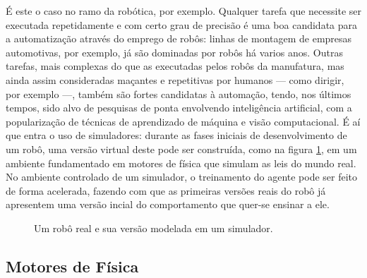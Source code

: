 \documentclass[cic,tc]{iiufrgs}
\begin{document}
É este o caso no ramo da robótica, por exemplo. Qualquer tarefa que necessite
ser executada repetidamente e com certo grau de precisão é uma boa candidata
para a automatização através do emprego de robôs: linhas de montagem de
empresas automotivas, por exemplo, já são dominadas por robôs há varios anos.
Outras tarefas, mais complexas do que as executadas pelos robôs da manufatura,
mas ainda assim consideradas maçantes e repetitivas por humanos --- como
dirigir, por exemplo ---, também são fortes candidatas à automação, tendo, nos
últimos tempos, sido alvo de pesquisas de ponta envolvendo inteligência
artificial, com a popularização de técnicas de aprendizado de máquina e visão
computacional. É aí que entra o uso de simuladores: durante as fases iniciais
de desenvolvimento de um robô, uma versão virtual deste pode ser construída,
como na figura \ref{fig:mujoco_robot}, em um ambiente fundamentado em motores
de física que simulam as leis do mundo real. No ambiente controlado de um
simulador, o treinamento do agente pode ser feito de forma acelerada, fazendo
com que as primeiras versões reais do robô já apresentem uma versão incial do
comportamento que quer-se ensinar a ele.

\begin{figure}[h]
    \caption{Um robô real e sua versão modelada em um simulador.}
    \begin{center}
    \end{center}
    \label{fig:mujoco_robot}
\end{figure}

\subsection{Motores de Física}
\end{document}
